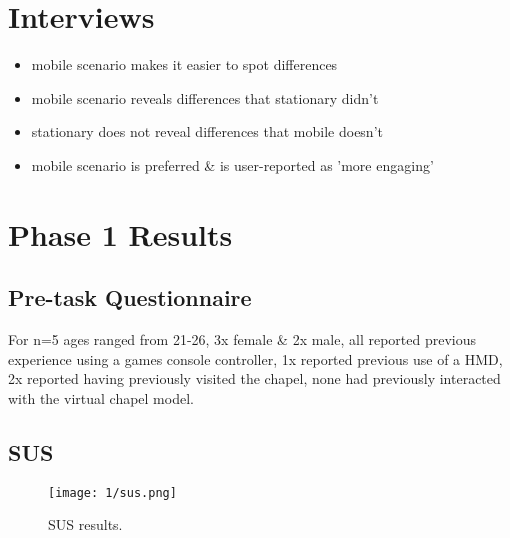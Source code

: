 \section{Interviews}
\begin{itemize}
	\item mobile scenario makes it easier to spot differences
	\item mobile scenario reveals differences that stationary didn't
	\item stationary does not reveal differences that mobile doesn't
	\item mobile scenario is preferred \& is user-reported as 'more engaging'
\end{itemize}


\section{Phase 1 Results}

\subsection{Pre-task Questionnaire}

For n=5 ages ranged from 21-26, 3x female \& 2x male, all reported previous experience using a games console controller, 1x reported previous use of a HMD, 2x reported having previously visited the chapel, none had previously interacted with the virtual chapel model.



\pagebreak

\subsection{SUS}

\begin{figure}[h]
	\begin{center}
		\texttt{[image: 1/sus.png]}
		\caption{SUS results.}
		\label{sus}
	\end{center}
\end{figure}

